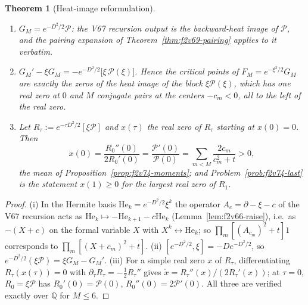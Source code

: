 \documentclass[11pt]{article}
\newtheorem{theorem}{Theorem}[section]
\theoremstyle{definition}
\theoremstyle{remark}
\begin{document}
\begin{theorem}[Heat-image reformulation]
\label{thm:f2v75-heat}
\begin{enumerate}[label=\textup{(\roman*)}]
\item \(G_M=e^{-D^2/2}\mathcal P\): the V67 recursion output is the
backward-heat image of \(\mathcal P\), and the pairing expansion of
Theorem~\ref{thm:f2v69-pairing} applies to it verbatim.
\item \(G_M'-\xi G_M=-e^{-D^2/2}\bigl[\xi\,\mathcal P(\xi)\bigr]\).  Hence
the critical points of \(F_M=e^{-\xi^2/2}G_M\) are exactly the zeros of the
heat image of the block \(\xi\mathcal P(\xi)\), which has one real zero
at \(0\) and \(M\) conjugate pairs at the centers \(-c_m<0\), all to the
left of the real zero.
\item Let \(R_\tau:=e^{-\tau D^2/2}[\xi\mathcal P]\) and \(x(\tau)\) the
real zero of \(R_\tau\) starting at \(x(0)=0\).  Then
\begin{equation}
 \dot x(0)=\frac{R_0''(0)}{2R_0'(0)}=\frac{\mathcal P'(0)}{\mathcal P(0)}
 =\sum_{m<M}\frac{2c_m}{c_m^2+t}>0,
 \label{eq:f2v75-velocity}
\end{equation}
the mean of Proposition~\ref{prop:f2v74-moments}; and
Problem~\ref{prob:f2v74-last} is the statement \(x(1)\ge0\) for the
largest real zero of \(R_1\).
\end{enumerate}
\end{theorem}

\begin{proof}
(i) In the Hermite basis \(\mathrm{He}_k=e^{-D^2/2}\xi^k\) the operator
\(A_c=\partial-\xi-c\) of the V67 recursion acts as
\(\mathrm{He}_k\mapsto-\mathrm{He}_{k+1}-c\mathrm{He}_k\)
(Lemma~\ref{lem:f2v66-raise}), i.e.\ as \(-( X+c)\) on the formal variable
\(X\) with \(X^k\leftrightarrow\mathrm{He}_k\); so
\(\prod_m[(A_{c_m})^2+t]1\) corresponds to \(\prod_m[(X+c_m)^2+t]\).
(ii) \([e^{-D^2/2},\xi]=-De^{-D^2/2}\), so
\(e^{-D^2/2}(\xi\mathcal P)=\xi G_M-G_M'\).  (iii) For a simple real zero
\(x\) of \(R_\tau\), differentiating \(R_\tau(x(\tau))=0\) with
\(\partial_\tau R_\tau=-\tfrac12R_\tau''\) gives \(\dot x=R_\tau''(x)/(2R_\tau'(x))\);
at \(\tau=0\), \(R_0=\xi\mathcal P\) has \(R_0'(0)=\mathcal P(0)\),
\(R_0''(0)=2\mathcal P'(0)\).  All three are verified exactly over
\(\mathbb Q\) for \(M\le6\).
\end{proof}
\end{document}
